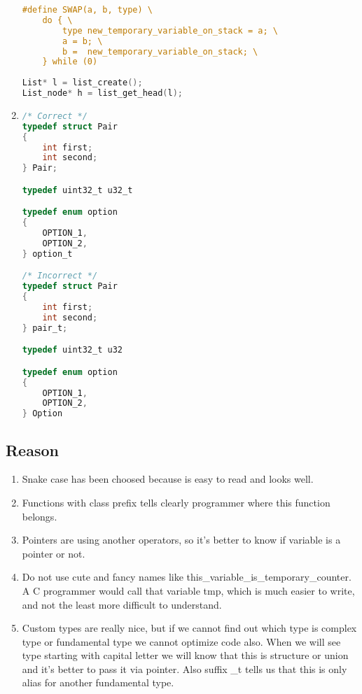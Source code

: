 \begin{enumerate}
\begin{lstlisting}[language=C,style=C99]
#define SWAP(a, b, type) \
    do { \
        type new_temporary_variable_on_stack = a; \
        a = b; \
        b =  new_temporary_variable_on_stack; \
    } while (0)
    
List* l = list_create();
List_node* h = list_get_head(l);
\end{lstlisting}

    \item
\begin{lstlisting}[language=C,style=C99]
/* Correct */
typedef struct Pair
{
    int first;
    int second;
} Pair;

typedef uint32_t u32_t

typedef enum option
{
    OPTION_1,
    OPTION_2,
} option_t

/* Incorrect */
typedef struct Pair
{
    int first;
    int second;
} pair_t;

typedef uint32_t u32

typedef enum option
{
    OPTION_1,
    OPTION_2,
} Option

\end{lstlisting}
\end{enumerate}

\subsection{Reason}
\begin{enumerate}
    \item Snake case has been choosed because is easy to read and looks well.
    \item Functions with class prefix tells clearly programmer where this function belongs.
    \item Pointers are using another operators, so it's better to know if variable is a pointer or not.
    \item Do not use cute and fancy names like this\_variable\_is\_temporary\_counter. A C programmer would call that variable tmp, which is much easier to write, and not the least more difficult to understand.
    \item Custom types are really nice, but if we cannot find out which type is complex type or fundamental type we cannot optimize code also. When  we will see type starting with capital letter we will know that this is structure or union and it's better to pass it via pointer. Also suffix \_t tells us that this is only alias for another fundamental type. 
\end{enumerate}
